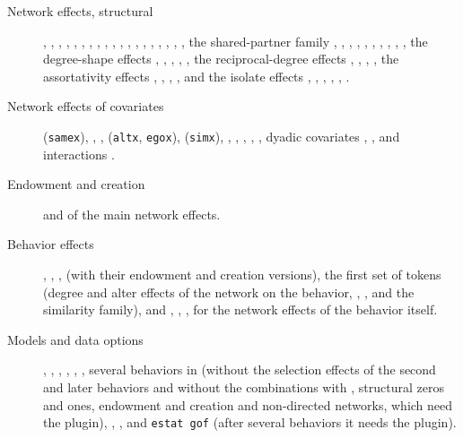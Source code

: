 \begin{description}
\item[Network effects, structural] , , , , , , , , , , , , , , , , , , , the shared-partner family , , , , , , , , , , the degree-shape effects , , , , , the reciprocal-degree effects , , , , the assortativity effects , , , , and the isolate effects , , , , , .
\item[Network effects of covariates]  (\texttt{samex}), , ,  (\texttt{altx}, \texttt{egox}),  (\texttt{simx}), , , , , , dyadic covariates , , and interactions .
\item[Endowment and creation]  and  of the main network effects.
\item[Behavior effects] , , ,  (with their endowment and creation versions), the first set of  tokens (degree and alter effects of the network on the behavior, , ,  and the similarity family), and , , ,  for the network effects of the behavior itself.
\item[Models and data options] , , , , , , several behaviors in  (without the selection effects of the second and later behaviors and without the combinations with , structural zeros and ones, endowment and creation and non-directed networks, which need the plugin), , , and \texttt{estat gof} (after several behaviors it needs the plugin).
\end{description}

